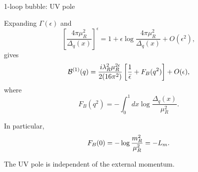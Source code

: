 \documentclass[aspectratio=169,10pt]{beamer}
\begin{document}
\begin{frame}{1-loop bubble: UV pole}

Expanding $\Gamma(\epsilon)$ and
\begin{equation}
\left[
\frac{4\pi\mu_R^2}{\Delta_q(x)}
\right]^\epsilon
=
1+
\epsilon
\log
\frac{4\pi\mu_R^2}{\Delta_q(x)}
+
O(\epsilon^2),
\end{equation}
gives
\begin{equation}
\mathcal B^{(1)}(q)
=
\frac{i\lambda_R^2\mu_R^{2\epsilon}}
{2(16\pi^2)}
\left[
\frac1{\bar\epsilon}
+
F_B(q^2)
\right]
+
O(\epsilon),
\end{equation}
where
\begin{equation}
F_B(q^2)
=
-\int_0^1 dx
\log
\frac{\Delta_q(x)}{\mu_R^2}.
\end{equation}

In particular,
\begin{equation}
F_B(0)
=
-\log\frac{m_R^2}{\mu_R^2}
=
-L_m.
\end{equation}

The UV pole is independent of the external momentum.

\end{frame}







\end{document}
